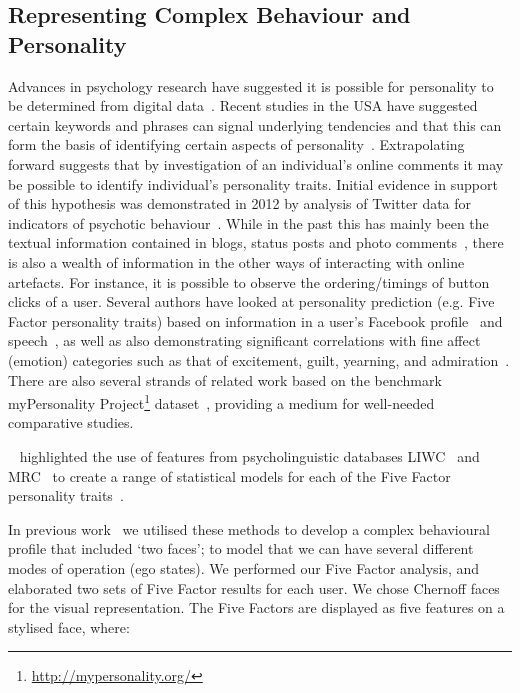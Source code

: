 \documentclass[letterpaper]{article}
\begin{document}
\subsection{Representing Complex Behaviour and Personality}

Advances in psychology research have suggested it is possible for
personality to be determined from digital
data~\cite{pennebaker+king:1999,vazire+gosling:2004,iacobelli-et-al:2011}.
Recent studies in the USA have suggested certain keywords and phrases
can signal underlying tendencies and that this can form the basis of
identifying certain aspects of
personality~\cite{woodworth-et-al:2012}.  Extrapolating forward
suggests that by investigation of an individual's online comments it
may be possible to identify individual's personality traits. Initial
evidence in support of this hypothesis was demonstrated in 2012 by
analysis of Twitter data for indicators of psychotic
behaviour~\cite{sumner-et-al:2012}. While in the past this has mainly
been the textual information contained in blogs, status posts and
photo comments~\cite{blamey-et-al-2012,blamey-et-al-2013}, there is
also a wealth of information in the other ways of interacting with
online artefacts. For instance, it is possible to observe the
ordering/timings of button clicks of a user. Several authors have
looked at personality prediction (e.g. Five Factor personality traits)
based on information in a user's Facebook
profile~\cite{back-et-al:2010,golbeck-et-al:2001} and
speech~\cite{chung+pennebaker:2007,tausczik+pennebaker:2010}, as well
as also demonstrating significant correlations with fine affect
(emotion) categories such as that of excitement, guilt, yearning, and
admiration~\cite{mohammad+kiritchenko:2013}. There are also several
strands of related work based on the benchmark myPersonality
Project\footnote{\url{http://mypersonality.org/}}
dataset~\cite{celli-et-al:2013}, providing a medium for well-needed
comparative studies.

\citeauthor{mairesse-et-al:2007}~
highlighted the use of features from psycholinguistic databases
LIWC~\cite{pennebaker-et-al:2001} and MRC~\cite{wilson:1988} to create
a range of statistical models for each of the Five Factor personality
traits~\cite{norman:1963,peabody+goldberg:1989}.

In previous work~\cite{oatley+crick:2014} we utilised these methods to
develop a complex behavioural profile that included `two faces'; to
model that we can have several different modes of operation (ego
states). We performed our Five Factor analysis, and elaborated two
sets of Five Factor results for each user. We chose Chernoff
faces~\cite{chernoff:1973} for the visual representation. The Five
Factors are displayed as five features on a stylised face, where:
\end{document}
